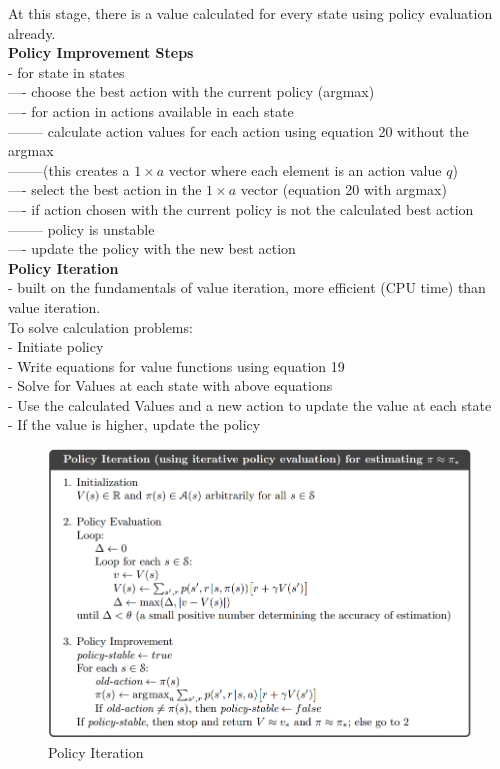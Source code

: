 \documentclass{article}
\begin{document}
\noindent
At this stage, there is a value calculated for every state using policy
evaluation already.\\

\noindent
\textbf{Policy Improvement Steps}\\
- for state in states \\
---- choose the best action with the current policy (argmax)\\
---- for action in actions available in each state \\
-------- calculate action values for each action using equation 20 without the
argmax\\
--------(this creates a $1 \times a$ vector where each element is an
action value $q$)\\
---- select the best action in the $ 1 \times a$ vector (equation 20 with
argmax)\\
---- if action chosen with the current policy is not the calculated best
action\\
-------- policy is unstable\\
---- update the policy with the new best action\\

\noindent
\textbf{Policy Iteration}\\
- built on the fundamentals of value iteration, more efficient (CPU time) than
value iteration.\\
\noindent
To solve calculation problems: \\
- Initiate policy\\
- Write equations for value functions using equation 19\\
- Solve for Values at each state with above equations\\
- Use the calculated Values and a new action to update the value at each state\\
- If the value is higher, update the policy

\begin{figure}[h]
\includegraphics[scale=0.4]{policy_iteration}
\centering
\caption{Policy Iteration}
\end{figure}
\end{document}
